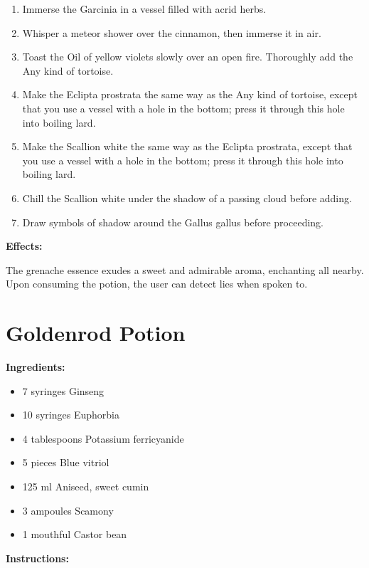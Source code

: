 \documentclass{article}
\begin{document}
\begin{enumerate}
  \item Immerse the Garcinia in a vessel filled with acrid herbs.
  \item Whisper a meteor shower over the cinnamon, then immerse it in air.
  \item Toast the Oil of yellow violets slowly over an open fire. Thoroughly add the Any kind of tortoise.
  \item Make the Eclipta prostrata the same way as the Any kind of tortoise, except that you use a vessel with a hole in the bottom; press it through this hole into boiling lard.
  \item Make the Scallion white the same way as the Eclipta prostrata, except that you use a vessel with a hole in the bottom; press it through this hole into boiling lard.
  \item Chill the Scallion white under the shadow of a passing cloud before adding.
  \item Draw symbols of shadow around the Gallus gallus before proceeding.
\end{enumerate}

\textbf{Effects:}

The grenache essence exudes a sweet and admirable aroma, enchanting all nearby. Upon consuming the potion, the user can detect lies when spoken to.

\newpage
\section*{Goldenrod Potion}

\textbf{Ingredients:}

\begin{itemize}
  \item 7 syringes Ginseng
  \item 10 syringes Euphorbia
  \item 4 tablespoons Potassium ferricyanide
  \item 5 pieces Blue vitriol
  \item 125 ml Aniseed, sweet cumin
  \item 3 ampoules Scamony
  \item 1 mouthful Castor bean
\end{itemize}

\textbf{Instructions:}
\end{document}

